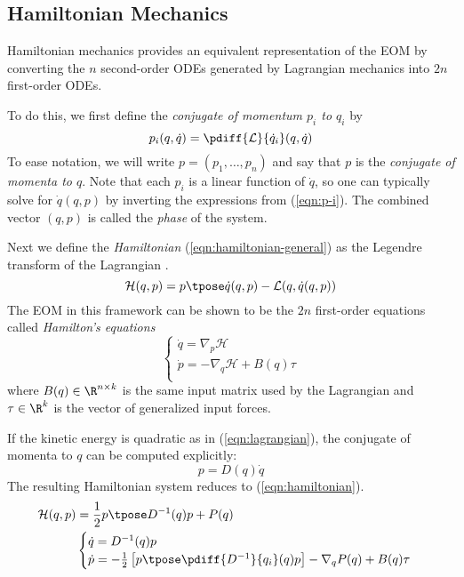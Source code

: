 \subsection{Hamiltonian Mechanics}
Hamiltonian mechanics provides an equivalent representation of the EOM
by converting the \(n\) second-order ODEs generated by Lagrangian mechanics into
\(2n\) first-order ODEs.

To do this, we first define the \textit{conjugate of momentum \(p_i\) to \(q_i\)} by
\begin{equation}\label{eqn:p-i}
    p_i(q,\dot{q}) = \pdiff{\mathcal{L}}{\dot{q}_i}(q,\dot{q})
\end{equation}
To ease notation, we will write \(p = (p_1, \ldots, p_n)\) and say that \(p\) is
the \textit{conjugate of momenta to \(q\)}. 
Note that each \(p_i\) is a linear function of \(\dot{q}\), so one can typically
solve for \(\dot{q}(q,p)\) by inverting the expressions from (\ref{eqn:p-i}).
The combined vector \((q,p)\) is called the \textit{phase} of the system.

Next we define the \textit{Hamiltonian} (\ref{eqn:hamiltonian-general}) 
as the Legendre transform of the Lagrangian \cite{landau_mechanics}.
\begin{equation}\label{eqn:hamiltonian-general}
    \mathcal{H}(q,p) = p\tpose \dot{q}(q,p) - \mathcal{L}(q,\dot{q}(q,p))
\end{equation}
The EOM in this framework can be shown to be the \(2n\)
first-order equations called \textit{Hamilton's equations}
\begin{equation}\label{eqn:hamiltons-eqns}
    \begin{cases}
        \dot{q} = \nabla_p\mathcal{H} \\
        \dot{p} = -\nabla_q\mathcal{H} + B(q)\tau \\
    \end{cases}
\end{equation}
where \(B(q) \in \R^{n\times k}\) is the same input matrix used by the
Lagrangian and \(\tau \in \R^k\) is the vector of generalized input forces.

If the kinetic energy is quadratic as in (\ref{eqn:lagrangian}), the conjugate of
momenta to \(q\) can be computed explicitly:
\[
    p = D(q)\dot{q}
\]
The resulting Hamiltonian system reduces to (\ref{eqn:hamiltonian}).
\begin{align}\label{eqn:hamiltonian}
    \mathcal{H}(q,p) &= \frac{1}{2} p\tpose D^{-1}(q) p + P(q) \\
                     &\begin{cases}
        \dot{q} = D^{-1}(q)p \\
        \dot{p} = -\frac{1}{2} \left[p\tpose \pdiff{D^{-1}}{q_i}(q) p\right] 
        - \nabla_q P(q) + B(q) \tau \\
    \end{cases} 
\end{align}

